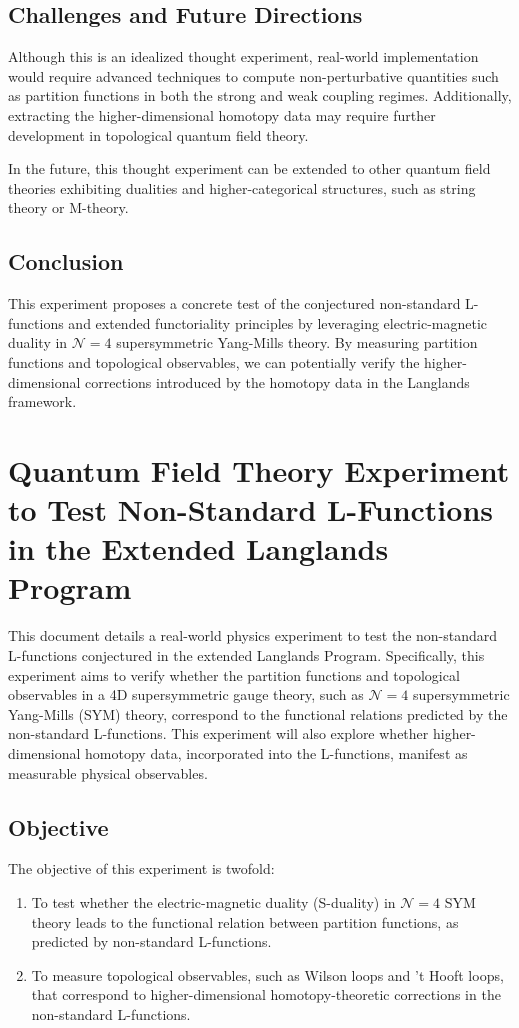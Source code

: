 \documentclass{article}
\theoremstyle{remark}
\begin{document}
\subsection{Challenges and Future Directions}
Although this is an idealized thought experiment, real-world implementation would require advanced techniques to compute non-perturbative quantities such as partition functions in both the strong and weak coupling regimes. Additionally, extracting the higher-dimensional homotopy data may require further development in topological quantum field theory.

In the future, this thought experiment can be extended to other quantum field theories exhibiting dualities and higher-categorical structures, such as string theory or M-theory.

\subsection{Conclusion}
This experiment proposes a concrete test of the conjectured non-standard L-functions and extended functoriality principles by leveraging electric-magnetic duality in $\mathcal{N}=4$ supersymmetric Yang-Mills theory. By measuring partition functions and topological observables, we can potentially verify the higher-dimensional corrections introduced by the homotopy data in the Langlands framework.



\section{Quantum Field Theory Experiment to Test Non-Standard L-Functions in the Extended Langlands Program}
This document details a real-world physics experiment to test the non-standard L-functions conjectured in the extended Langlands Program. Specifically, this experiment aims to verify whether the partition functions and topological observables in a 4D supersymmetric gauge theory, such as $ \mathcal{N}=4 $ supersymmetric Yang-Mills (SYM) theory, correspond to the functional relations predicted by the non-standard L-functions. This experiment will also explore whether higher-dimensional homotopy data, incorporated into the L-functions, manifest as measurable physical observables.

\subsection{Objective}
The objective of this experiment is twofold:
\begin{enumerate}
    \item To test whether the electric-magnetic duality (S-duality) in $ \mathcal{N}=4 $ SYM theory leads to the functional relation between partition functions, as predicted by non-standard L-functions.
    \item To measure topological observables, such as Wilson loops and 't Hooft loops, that correspond to higher-dimensional homotopy-theoretic corrections in the non-standard L-functions.
\end{enumerate}
\end{document}
